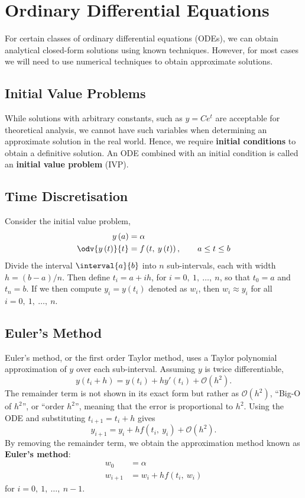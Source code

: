 \documentclass{article}
\begin{document}
\section{Ordinary Differential Equations}
For certain classes of ordinary differential equations (ODEs), we can
obtain analytical closed-form solutions using known techniques. However,
for most cases we will need to use numerical techniques to obtain
approximate solutions.
\subsection{Initial Value Problems}
While solutions with arbitrary constants, such as \(y = C e^{t}\) are
acceptable for theoretical analysis, we cannot have such variables when
determining an approximate solution in the real world. Hence, we require
\textbf{initial conditions} to obtain a definitive solution. An ODE
combined with an initial condition is called an \textbf{initial value
problem} (IVP).
\subsection{Time Discretisation}
Consider the initial value problem,
\begin{align*}
    y\left( a \right)          & = \alpha                                                              \\
    \odv{y\left( t \right)}{t} & = f\left( t,\: y\left( t \right) \right), \quad \quad a \leq t \leq b
\end{align*}
Divide the interval \(\interval{a}{b}\) into \(n\) sub-intervals, each
with width \(h = \left( b - a \right) / n\). Then define
\(t_i = a + i h\), for \(i = 0,\: 1,\: \ldots,\: n\), so that
\(t_0 = a\) and \(t_n = b\). If we then compute
\(y_i = y\left( t_i \right)\) denoted as \(w_i\), then
\(w_i \approx y_i\) for all \(i = 0,\: 1,\: \ldots,\: n\).
\subsection{Euler's Method}
Euler's method, or the first order Taylor method, uses a Taylor
polynomial approximation of \(y\) over each sub-interval. Assuming \(y\)
is twice differentiable,
\begin{equation*}
    y\left( t_i + h \right) = y\left( t_i \right) + h y'\left( t_i \right) + \mathcal{O}\left( h^2 \right).
\end{equation*}
The remainder term is not shown in its exact form but rather as
\(\mathcal{O}\left( h^2 \right)\), ``Big-O of \(h^2\)'', or
``order \(h^2\)'', meaning that the error is proportional to \(h^2\).
Using the ODE and substituting \(t_{i + 1} = t_i + h\) gives
\begin{equation*}
    y_{i + 1} = y_i + h f\left( t_i,\: y_i \right) + \mathcal{O}\left( h^2 \right).
\end{equation*}
By removing the remainder term, we obtain the approximation method known
as \textbf{Euler's method}:
\begin{align*}
    w_0       & = \alpha                             \\
    w_{i + 1} & = w_i + h f\left( t_i,\: w_i \right)
\end{align*}
for \(i = 0,\: 1,\: \ldots,\: n - 1\).
\end{document}
